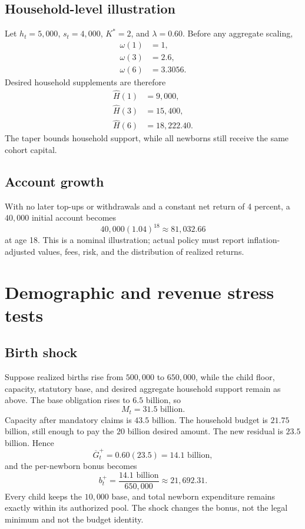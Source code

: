 \documentclass[11pt]{article}
\begin{document}
\subsection{Household-level illustration}

Let $h_t=5{,}000$, $s_t=4{,}000$, $K^*=2$, and $\lambda=0.60$. Before any aggregate
scaling,
\begin{align*}
  \omega(1)&=1,\\
  \omega(3)&=2.6,\\
  \omega(6)&=3.3056.
\end{align*}
Desired household supplements are therefore
\begin{align*}
  \widehat H(1)&=9{,}000,\\
  \widehat H(3)&=15{,}400,\\
  \widehat H(6)&=18{,}222.40.
\end{align*}
The taper bounds household support, while all newborns still receive the same cohort
capital.

\subsection{Account growth}

With no later top-ups or withdrawals and a constant net return of 4 percent, a $40{,}000$
initial account becomes
\begin{equation*}
  40{,}000(1.04)^{18}\approx81{,}032.66
\end{equation*}
at age 18. This is a nominal illustration; actual policy must report inflation-adjusted
values, fees, risk, and the distribution of realized returns.

\section{Demographic and revenue stress tests}

\subsection{Birth shock}

Suppose realized births rise from $500{,}000$ to $650{,}000$, while the child floor,
capacity, statutory base, and desired aggregate household support remain as above. The
base obligation rises to $6.5$ billion, so
\begin{equation*}
  M_t=31.5\text{ billion}.
\end{equation*}
Capacity after mandatory claims is $43.5$ billion. The household budget is $21.75$
billion, still enough to pay the $20$ billion desired amount. The new residual is $23.5$
billion. Hence
\begin{equation*}
  \overline G_t^+=0.60(23.5)=14.1\text{ billion},
\end{equation*}
and the per-newborn bonus becomes
\begin{equation*}
  b_t^+=\frac{14.1\text{ billion}}{650{,}000}
  \approx21{,}692.31.
\end{equation*}
Every child keeps the $10{,}000$ base, and total newborn expenditure remains exactly
within its authorized pool. The shock changes the bonus, not the legal minimum and not
the budget identity.
\end{document}
